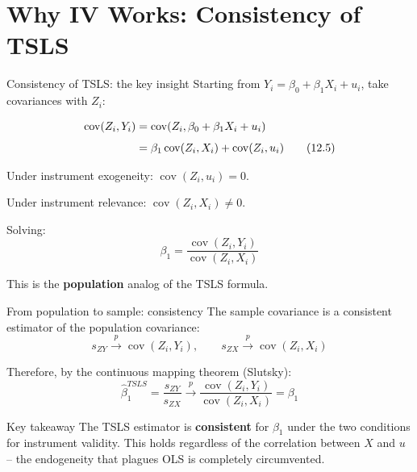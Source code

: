 \documentclass[10pt]{beamer}
\begin{document}
\section{Why IV Works: Consistency of TSLS}

\begin{frame}{Consistency of TSLS: the key insight}
\label{slide:consistency}
Starting from $Y_i = \beta_0 + \beta_1 X_i + u_i$, take covariances with $Z_i$:

\pause
\begin{align}
\operatorname{cov}(Z_i, Y_i) &= \operatorname{cov}(Z_i, \beta_0 + \beta_1 X_i + u_i) \notag \\[4pt]
&= \beta_1 \operatorname{cov}(Z_i, X_i) + \operatorname{cov}(Z_i, u_i) \tag{12.5}
\end{align}

\pause
Under \alert{instrument exogeneity}: $\operatorname{cov}(Z_i, u_i) = 0$.

Under \alert{instrument relevance}: $\operatorname{cov}(Z_i, X_i) \neq 0$.

\pause
Solving:
\[
\boxed{\beta_1 = \frac{\operatorname{cov}(Z_i, Y_i)}{\operatorname{cov}(Z_i, X_i)}} \tag{12.6}
\]

This is the \textbf{population} analog of the TSLS formula.
\end{frame}

\begin{frame}{From population to sample: consistency}
\label{slide:consistency_proof}
The sample covariance is a consistent estimator of the population covariance:
\[
s_{ZY} \xrightarrow{p} \operatorname{cov}(Z_i, Y_i), \qquad s_{ZX} \xrightarrow{p} \operatorname{cov}(Z_i, X_i)
\]

\pause
Therefore, by the continuous mapping theorem (Slutsky):
\[
\widehat{\beta}_1^{TSLS} = \frac{s_{ZY}}{s_{ZX}} \xrightarrow{p} \frac{\operatorname{cov}(Z_i, Y_i)}{\operatorname{cov}(Z_i, X_i)} = \beta_1 \tag{12.7}
\]

\pause
\begin{exampleblock}{Key takeaway}
The TSLS estimator is \textbf{consistent} for $\beta_1$ under the two conditions for instrument validity. This holds regardless of the correlation between $X$ and $u$ -- the endogeneity that plagues OLS is completely circumvented.
\end{exampleblock}
\end{frame}
\end{document}
